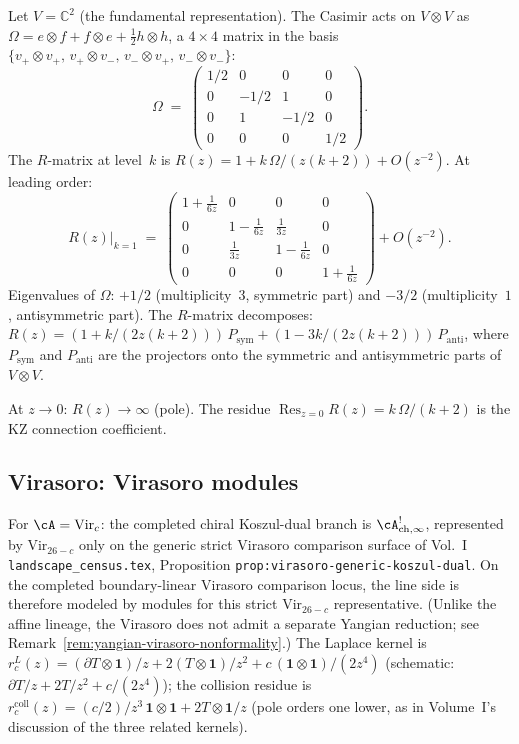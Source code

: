 \begin{computation}
\label{comp:explicit-r-matrix-sl2}
Let $V=\mathbb C^2$ (the fundamental representation).
The Casimir acts on $V\otimes V$ as
$\Omega=e\otimes f+f\otimes e+\tfrac12 h\otimes h$,
a $4\times 4$ matrix in the basis $\{v_+\otimes v_+,\,
v_+\otimes v_-,\,v_-\otimes v_+,\,v_-\otimes v_-\}$:
\[
\Omega
\;=\;
\begin{pmatrix}
1/2 & 0 & 0 & 0 \\
0 & -1/2 & 1 & 0 \\
0 & 1 & -1/2 & 0 \\
0 & 0 & 0 & 1/2
\end{pmatrix}.
\]
The $R$-matrix at level~$k$ is
$R(z)=1+k\,\Omega/(z(k{+}2))+O(z^{-2})$. At leading order:
\[
R(z)\big|_{k=1}
\;=\;
\begin{pmatrix}
1+\frac{1}{6z} & 0 & 0 & 0 \\[3pt]
0 & 1-\frac{1}{6z} & \frac{1}{3z} & 0 \\[3pt]
0 & \frac{1}{3z} & 1-\frac{1}{6z} & 0 \\[3pt]
0 & 0 & 0 & 1+\frac{1}{6z}
\end{pmatrix}
+O(z^{-2}).
\]
Eigenvalues of $\Omega$: $+1/2$ (multiplicity~$3$, symmetric
part) and $-3/2$ (multiplicity~$1$, antisymmetric part).
The $R$-matrix decomposes:
$R(z)=(1+k/(2z(k{+}2)))\,P_{\mathrm{sym}}
+(1-3k/(2z(k{+}2)))\,P_{\mathrm{anti}}$,
where $P_{\mathrm{sym}}$ and $P_{\mathrm{anti}}$ are the
projectors onto the symmetric and antisymmetric parts
of $V\otimes V$.

At $z\to 0$: $R(z)\to\infty$ (pole). The residue
$\operatorname{Res}_{z=0}R(z)=k\,\Omega/(k{+}2)$ is the
KZ connection coefficient.
\end{computation}

\subsection{Virasoro: Virasoro modules}
\label{subsec:line-op-virasoro}

For $\cA=\mathrm{Vir}_c$: the completed chiral Koszul-dual branch is
$\cA^!_{\mathrm{ch},\infty}$, represented by
$\mathrm{Vir}_{26-c}$ only on the generic strict Virasoro comparison
surface of Vol.~I
\texttt{landscape\_census.tex}, Proposition
\texttt{prop:virasoro-generic-koszul-dual}.
On the completed boundary-linear Virasoro comparison locus, the
line side is therefore modeled by modules for this strict
$\mathrm{Vir}_{26-c}$ representative.
(Unlike the affine lineage, the Virasoro does not admit a
separate Yangian reduction; see
Remark~\textup{\ref{rem:yangian-virasoro-nonformality}}.)
The Laplace kernel is
$r^L_c(z)=(\partial T \otimes \mathbf{1})/z+2(T \otimes \mathbf{1})/z^2+c\,(\mathbf{1}\otimes\mathbf{1})/(2z^4)$
(schematic: $\partial T/z+2T/z^2+c/(2z^4)$);
the collision residue is
$r^{\mathrm{coll}}_c(z) = (c/2)/z^3\,\mathbf{1}\otimes\mathbf{1}
+ 2T\otimes\mathbf{1}/z$
(pole orders one lower, as in Volume~I's discussion of the three
related kernels).

